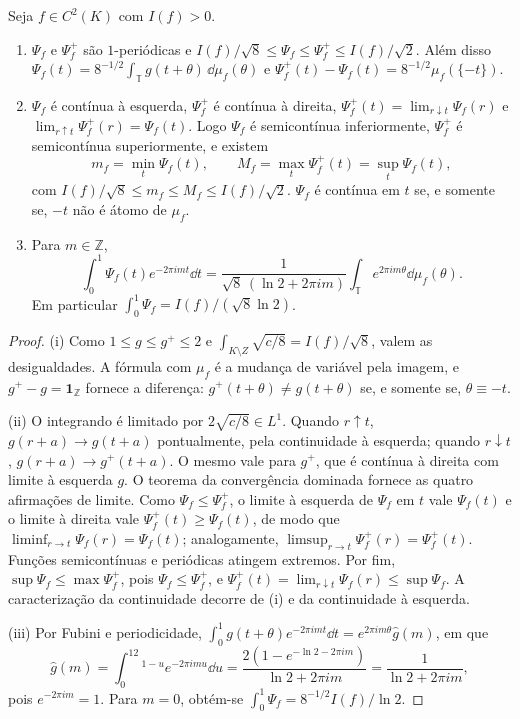 \begin{lemma}\label{map:artigo_2:12.5}
\label{artigo_2:lem:phase-function-properties}
Seja $f\in C^2(K)$ com $I(f)>0$.
\begin{enumerate}[label=(\roman*)]
\item $\Psi_f$ e $\Psi_f^+$ são $1$-periódicas e
 $I(f)/\sqrt8\le\Psi_f\le\Psi_f^+\le I(f)/\sqrt2$. Além disso
 $\Psi_f(t)=8^{-1/2}\int_{\mathbb T}g(t+\theta)\,\dd\mu_f(\theta)$ e
 $\Psi_f^+(t)-\Psi_f(t)=8^{-1/2}\mu_f(\{-t\})$.
\item $\Psi_f$ é contínua à esquerda, $\Psi_f^+$ é contínua à direita,
 $\Psi_f^+(t)=\lim_{r\downarrow t}\Psi_f(r)$ e $\lim_{r\uparrow t}\Psi_f^+(r)=\Psi_f(t)$.
 Logo $\Psi_f$ é semicontínua inferiormente, $\Psi_f^+$ é semicontínua
 superiormente, e existem
 \[
  m_f=\min_{t}\Psi_f(t),\qquad M_f=\max_t\Psi_f^+(t)=\sup_t\Psi_f(t),
 \]
 com $I(f)/\sqrt8\le m_f\le M_f\le I(f)/\sqrt2$.
 $\Psi_f$ é contínua em $t$ se, e somente se, $-t$ não é átomo de $\mu_f$.
\item Para $m\in\mathbb Z$,
 \[
  \int_0^1\Psi_f(t)e^{-2\pi imt}\dd t
  =\frac{1}{\sqrt8\,(\ln2+2\pi im)}\int_{\mathbb T}e^{2\pi im\theta}\dd\mu_f(\theta).
 \]
 Em particular $\int_0^1\Psi_f=I(f)/(\sqrt8\ln2)$.
\end{enumerate}
\end{lemma}

\begin{proof}
(i) Como $1\le g\le g^+\le2$ e $\int_{K\setminus Z}\sqrt{c/8}=I(f)/\sqrt8$, valem as
desigualdades. A fórmula com $\mu_f$ é a mudança de variável pela imagem, e
$g^+-g=\mathbf 1_{\mathbb Z}$ fornece a diferença: $g^+(t+\theta)\ne g(t+\theta)$
se, e somente se, $\theta\equiv-t$.

(ii) O integrando é limitado por $2\sqrt{c/8}\in L^1$. Quando $r\uparrow t$,
$g(r+a)\to g(t+a)$ pontualmente, pela continuidade à esquerda; quando
$r\downarrow t$, $g(r+a)\to g^+(t+a)$. O mesmo vale para $g^+$, que é
contínua à direita com limite à esquerda $g$. O teorema da convergência
dominada fornece as quatro afirmações de limite. Como $\Psi_f\le\Psi_f^+$, o limite à
esquerda de $\Psi_f$ em $t$ vale $\Psi_f(t)$ e o limite à direita vale
$\Psi_f^+(t)\ge\Psi_f(t)$, de modo que $\liminf_{r\to t}\Psi_f(r)=\Psi_f(t)$;
analogamente, $\limsup_{r\to t}\Psi_f^+(r)=\Psi_f^+(t)$. Funções
semicontínuas e periódicas atingem extremos. Por fim, $\sup\Psi_f\le\max\Psi_f^+$,
pois $\Psi_f\le\Psi_f^+$, e $\Psi_f^+(t)=\lim_{r\downarrow t}\Psi_f(r)\le\sup\Psi_f$.
A caracterização da continuidade decorre de (i) e da continuidade à esquerda.

(iii) Por Fubini e periodicidade,
$\int_0^1g(t+\theta)e^{-2\pi imt}\dd t=e^{2\pi im\theta}\hat g(m)$, em que
\[
 \hat g(m)=\int_0^12^{1-u}e^{-2\pi imu}\dd u
 =\frac{2(1-e^{-\ln2-2\pi im})}{\ln2+2\pi im}=\frac1{\ln2+2\pi im},
\]
pois $e^{-2\pi im}=1$. Para $m=0$, obtém-se $\int_0^1\Psi_f=8^{-1/2}I(f)/\ln2$.
\end{proof}


